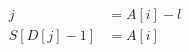 \documentclass[preview]{standalone}
\begin{document}
\begin{center}
\begin{align*}j & = A[i] - l \\S[D[j] - 1] & = A[i]\end{align*}
\end{center}
\end{document}
